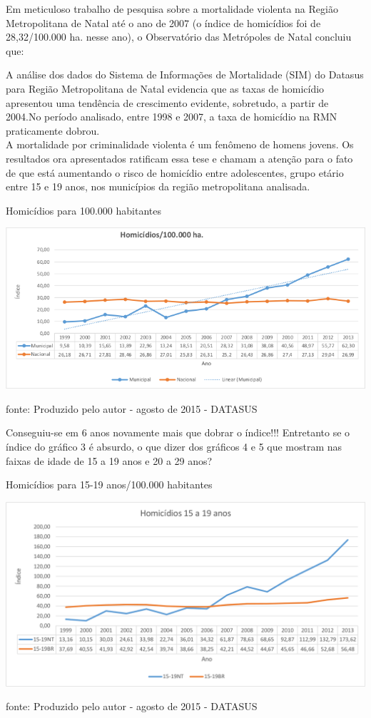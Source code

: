 \documentclass[
	12pt,				%
	openright,			%
	twoside,			%
	a4paper,			%
	chapter=TITLE,		%
	section=TITLE,		%
	subsection=TITLE,	%
	subsubsection=TITLE,%
	spanish,            %
	english,			%
	brazil				%
	]{abntex2}
\begin{document}
\par
Em meticuloso trabalho de pesquisa sobre a mortalidade violenta na Região Metropolitana de Natal até o ano de 2007 (o índice de homicídios foi de 28,32/100.000 ha. nesse ano), o Observatório das Metrópoles de Natal concluiu que:
\begin{citacao}
	A análise dos dados do Sistema de Informações de Mortalidade (SIM) do Datasus para Região Metropolitana de Natal evidencia que
	as taxas de homicídio apresentou uma tendência de crescimento evidente, sobretudo, a partir de 2004.No período analisado, entre
	1998 e 2007, a taxa de homicídio na RMN praticamente dobrou.\\
	A mortalidade por criminalidade violenta é um fenômeno de homens jovens. Os resultados ora apresentados ratificam essa tese e
	chamam a atenção para o fato de que está aumentando o risco de	homicídio entre adolescentes, grupo etário entre 15 e 19 anos, nos
	municípios da região metropolitana analisada.\cite[p. ~92]{Bezerra}
\end{citacao}\begin{grafico}[!htb]
\begin{center}
	\caption{Homicídios para 100.000 habitantes}
	\includegraphics[scale=0.75]{Homicidios-geral.png}
\end{center}
\ABNTEXchapterfont\small{fonte: Produzido pelo autor - agosto de 2015 - DATASUS}
\label{Homicidios}
\end{grafico}
\FloatBarrier
Conseguiu-se em 6 anos novamente mais que dobrar o índice!!! Entretanto se o índice do gráfico 3 é absurdo, o que dizer dos gráficos 4 e 5 que mostram nas faixas de idade de 15 a 19 anos e 20 a 29 anos?
\begin{grafico}[h]
	\begin{center}
		\caption{Homicídios para 15-19 anos/100.000 habitantes}
		\includegraphics[scale=0.5]{juventude-15-19.png}
	\end{center}
	\ABNTEXchapterfont\small{fonte: Produzido pelo autor - agosto de 2015 - DATASUS}
	\label{Homicidios15-19}
\end{grafico}
\end{document}
